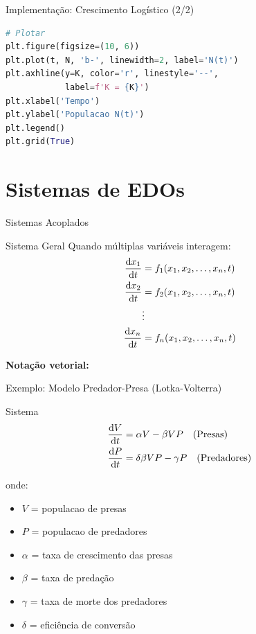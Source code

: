 \begin{frame}[fragile, shrink=5]{Implementação: Crescimento Logístico (2/2)}
\begin{lstlisting}[language=Python, caption=Visualização]
# Plotar
plt.figure(figsize=(10, 6))
plt.plot(t, N, 'b-', linewidth=2, label='N(t)')
plt.axhline(y=K, color='r', linestyle='--',
            label=f'K = {K}')
plt.xlabel('Tempo')
plt.ylabel('Populacao N(t)')
plt.legend()
plt.grid(True)
\end{lstlisting}
\end{frame}

\section{Sistemas de EDOs}

\begin{frame}[shrink=15]{Sistemas Acoplados}
\begin{block}{Sistema Geral}
Quando múltiplas variáveis interagem:
\begin{align*}
\frac{\mathrm{d} x_1}{\mathrm{d} t} &= f_1(x_1, x_2, \ldots, x_n, t)\\
\frac{\mathrm{d} x_2}{\mathrm{d} t} &= f_2(x_1, x_2, \ldots, x_n, t)\\
&\vdots\\
\frac{\mathrm{d} x_n}{\mathrm{d} t} &= f_n(x_1, x_2, \ldots, x_n, t)
\end{align*}
\end{block}

\textbf{Notação vetorial:}
\end{frame}

\begin{frame}[shrink=15]{Exemplo: Modelo Predador-Presa (Lotka-Volterra)}
\begin{block}{Sistema}
\small
\begin{align*}
\frac{\mathrm{d} V}{\mathrm{d} t} &= \alpha V - \beta V P \quad \text{(Presas)}\\
\frac{\mathrm{d} P}{\mathrm{d} t} &= \delta \beta V P - \gamma P \quad \text{(Predadores)}
\end{align*}

onde:
\begin{itemize}
    \item $V$ = populacao de presas
    \item $P$ = populacao de predadores
    \item $\alpha$ = taxa de crescimento das presas
    \item $\beta$ = taxa de predação
    \item $\gamma$ = taxa de morte dos predadores
    \item $\delta$ = eficiência de conversão
\end{itemize}
\end{block}
\end{frame}

